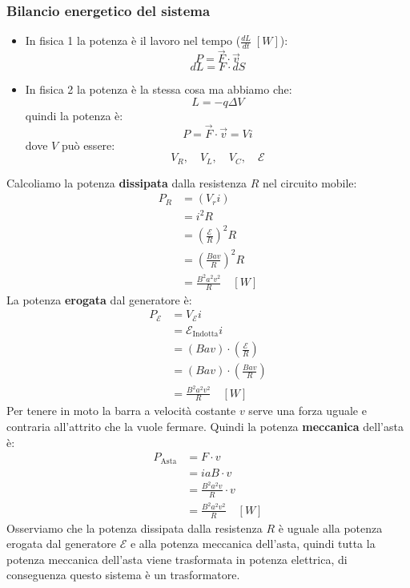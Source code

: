 \documentclass[a4paper]{article}
\begin{document}
\subsubsection{Bilancio energetico del sistema}
\begin{itemize}
  \item In fisica 1 la potenza è il lavoro nel tempo
    (\( \frac{dL}{dt} \; \left[ W \right] \)):
    \[
      P = \vec{F} \cdot \vec{v}
    \]
    \[
      dL = F \cdot dS
    \] 

  \item In fisica 2 la potenza è la stessa cosa ma abbiamo che:
    \[
      L = -q \Delta V
    \] 
    quindi la potenza è:
    \[
      P = \vec{F} \cdot \vec{v} = Vi
    \] 
    dove \( V \) può essere:
    \[
      V_R, \quad V_L, \quad V_C, \quad \mathcal{E}
    \] 
\end{itemize}
Calcoliamo la potenza \textbf{dissipata} dalla resistenza \( R \) nel circuito mobile:
\[
  \begin{aligned}
    P_R &= (V_r i)\\
        &= i^2 R\\
        &= \left( \frac{\mathcal{E}}{R} \right)^2 R\\
        &= \left( \frac{Bav}{R} \right)^2 R\\
        &= \frac{B^2 a^2 v^2}{R} \quad \left[ W \right]
  \end{aligned}
\] 
La potenza \textbf{erogata} dal generatore è:
\[
  \begin{aligned}
    P_{\mathcal{E}} &= V_{\mathcal{E}} i \\
                    &= \mathcal{E}_{\text{Indotta}} i \\
                    &= (Bav) \cdot (\frac{\mathcal{E}}{R})\\
                    &= (Bav) \cdot (\frac{Bav}{R})\\
                    &= \frac{B^2 a^2 v^2}{R} \quad \left[ W \right]
  \end{aligned}
\] 
Per tenere in moto la barra a velocità costante \( v \) serve una forza uguale e contraria
all'attrito che la vuole fermare. Quindi la potenza \textbf{meccanica} dell'asta è:
\[
  \begin{aligned}
    P_{\text{Asta}} &= F \cdot v\\
                    &= iaB \cdot v\\
                    &= \frac{B^2 a^2 v}{R} \cdot v\\
                    &= \frac{B^2 a^2 v^2}{R} \quad \left[ W \right]
  \end{aligned}
\] 
Osserviamo che la potenza dissipata dalla resistenza \( R \) è uguale alla potenza
erogata dal generatore \( \mathcal{E} \) e alla potenza meccanica dell'asta, quindi
tutta la potenza meccanica dell'asta viene trasformata in potenza elettrica, di conseguenza
questo sistema è un trasformatore.
\end{document}
